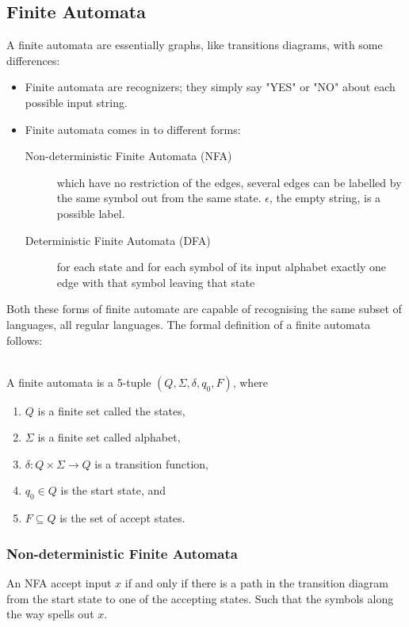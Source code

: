 \subsection{Finite Automata}
A finite automata are essentially graphs, like transitions diagrams, with some 
differences:
\begin{itemize}
  \item Finite automata are recognizers; they simply say "YES" or "NO" about 
each possible input string.
  \item Finite automata comes in to different forms:
    \begin{description}
      \item [Non-deterministic Finite Automata (NFA)] which have no restriction 
of the edges, several edges can be labelled by the same symbol out from the 
same state. $\epsilon$, the empty string, is a possible label. 
      \item [Deterministic Finite Automata (DFA)] for each state and for each 
symbol of its input alphabet exactly one edge with that symbol leaving that 
state
    \end{description}
\end{itemize}
Both these forms of finite automate are capable of recognising the same 
subset of languages, all regular languages. \cite{Aho2006}
The formal definition of a finite automata follows:
\begin{definition} \label{finiteAutomataDef} 
\cite{sipser2006} \\
A finite automata is a 5-tuple $(Q, \Sigma, \delta, q_0, F)$, where
\begin{enumerate}
  \item $Q$ is a finite set called the states,
  \item $\Sigma$ is a finite set called alphabet,
  \item $\delta: Q \times \Sigma \to Q$ is a transition function,
  \item $q_0 \in Q$ is the start state, and
  \item $F \subseteq Q$ is the set of accept states.
\end{enumerate}

\end{definition}
\subsubsection{Non-deterministic Finite Automata}
An NFA accept input $x$ if and only if there is a path in the transition 
diagram from the start state to one of the accepting states. Such that the 
symbols along the way spells out $x$. \cite{Aho2006}

